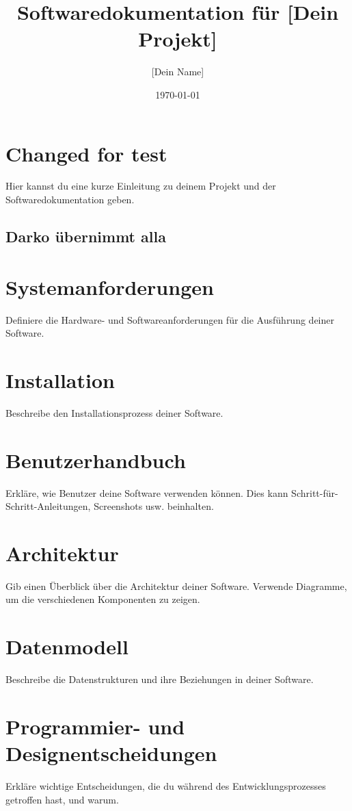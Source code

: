 \documentclass[a4paper, 12pt]{article}
\title{Softwaredokumentation für [Dein Projekt]}
\author{[Dein Name]}
\date{\today}
\begin{document}
    \maketitle
    \tableofcontents
    \newpage

    \section{Changed for test}
    Hier kannst du eine kurze Einleitung zu deinem Projekt und der Softwaredokumentation geben.
    
    \subsection{Darko übernimmt alla}

    \section{Systemanforderungen}
    Definiere die Hardware- und Softwareanforderungen für die Ausführung deiner Software.

    \section{Installation}
    Beschreibe den Installationsprozess deiner Software.

    \section{Benutzerhandbuch}
    Erkläre, wie Benutzer deine Software verwenden können. Dies kann Schritt-für-Schritt-Anleitungen, Screenshots usw. beinhalten.

    \section{Architektur}
    Gib einen Überblick über die Architektur deiner Software. Verwende Diagramme, um die verschiedenen Komponenten zu zeigen.

    \section{Datenmodell}
    Beschreibe die Datenstrukturen und ihre Beziehungen in deiner Software.

    \section{Programmier- und Designentscheidungen}
    Erkläre wichtige Entscheidungen, die du während des Entwicklungsprozesses getroffen hast, und warum.
\end{document}
